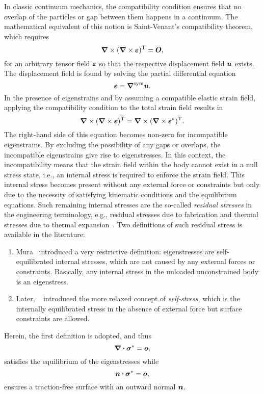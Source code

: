 In classic continuum mechanics, the compatibility condition ensures that no overlap of the particles or gap between them happens in a continuum. The mathematical equivalent of this notion is Saint-Venant's compatibility theorem, which requires 
\begin{equation}
\curl{(\curl{\tenb{\varepsilon}})^\tran}=\nullb,\label{eq:saint}
\end{equation}
for an arbitrary tensor field $\tenb{\varepsilon}$ so that the respective displacement field $\tena{u}$ exists. The displacement field is found by solving the partial differential equation
\begin{equation}
\tenb{\varepsilon}=\gradsym{\tena{u}}.\label{eq:kinematics}
\end{equation}
In the presence of eigenstrains and by assuming a compatible elastic strain field, applying the compatibility condition to the total strain field results in
\begin{equation}
\curl{(\curl{\tenb{\varepsilon}})^\tran}=\curl{(\curl{\tenb{\varepsilon}^\eigen})^\tran}.\label{eq:sainttotal}
\end{equation}
    The right-hand side of this equation becomes non-zero for incompatible eigenstrains. By excluding the possibility of any gaps or overlaps, the incompatible eigenstrains give rise to eigenstresses. In this context, the incompatibility means that the strain field within the body cannot exist in a null stress state, i.e., an internal stress is required to enforce the strain field. This internal stress becomes present without any external force or constraints but only due to the necessity of satisfying kinematic conditions and the equilibrium equations. Such remaining internal stresses are the so-called \textit{residual stresses} in the engineering terminology, e.g., residual stresses due to fabrication and thermal stresses due to thermal expansion~\autocite{Hill.1996}. Two definitions of such residual stress is available in the literature:
\begin{enumerate}
\item Mura~\autocite*{Mura.1987} introduced a very restrictive definition: eigenstresses are self-equilibrated internal stresses, which are not caused by any external forces or constraints. Basically, any internal stress in the unloaded unconstrained body is an eigenstress.
\item Later, \citeauthor{Irschik.1988}~\autocite*{Irschik.1988} introduced the more relaxed concept of \textit{self-stress}, which is the internally equilibrated stress in the absence of external force but surface constraints are allowed.
\end{enumerate}
Herein, the first definition is adopted, and thus
\begin{equation}
\diver{\tenb{\sigma}^\eigen}=\nulla,\label{eq:eigenstressbalance}
\end{equation}
satisfies the equilibrium of the eigenstresses while
\begin{equation}
\tena{n}\scp\tenb{\sigma}^\eigen =\nulla,
\end{equation}
ensures a traction-free surface with an outward normal $\tena{n}$. 

